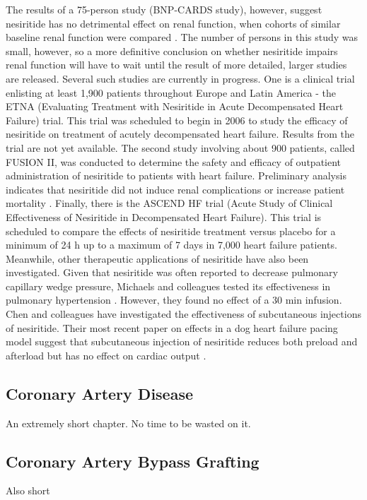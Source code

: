 \documentclass[14pt,a4paper,onecolumn]{extarticle}
\begin{document}
The results of a 75-person study (BNP-CARDS study), however, suggest nesiritide has no detrimental effect on renal function, when cohorts of similar baseline renal function were compared \citep{Witteles2007}. The number of persons in this study was small, however, so a more definitive conclusion on whether nesiritide impairs renal function will have to wait until the result of more detailed, larger studies are released. Several such studies are currently in progress. One is a clinical trial enlisting at least 1,900 patients throughout Europe and Latin America - the ETNA (Evaluating Treatment with Nesiritide in Acute Decompensated Heart Failure) trial.
This trial was scheduled to begin in 2006 to study the efficacy of nesiritide on treatment of acutely decompensated heart failure. Results from the trial are not yet available. The second study involving about 900 patients, called FUSION II, was conducted to determine the safety and efficacy of outpatient administration of nesiritide to patients with heart failure. Preliminary analysis indicates that nesiritide did not induce renal complications or increase patient mortality \citep{Cleland2007}. %
Finally, there is the ASCEND HF trial (Acute Study of Clinical Effectiveness of Nesiritide in Decompensated Heart Failure). This trial is scheduled to compare the effects of nesiritide treatment versus placebo for a minimum of 24 h up to a maximum of 7 days in 7,000 heart failure patients. Meanwhile, other therapeutic applications of nesiritide have also been investigated. Given that nesiritide was often reported to decrease pulmonary capillary wedge pressure, Michaels and colleagues tested its effectiveness in pulmonary hypertension \citep{Michaels2005}.
However, they found no effect of a 30 min infusion. Chen and colleagues have investigated the effectiveness of subcutaneous injections of nesiritide. Their most recent paper on effects in a dog heart failure pacing model suggest that subcutaneous injection of nesiritide reduces both preload and afterload but has no effect on cardiac output \citep{Chen2006}.

\subsection{Coronary Artery Disease}
An extremely short chapter.  No time to be wasted on it.

\subsection{Coronary Artery Bypass Grafting}
Also short
\end{document}
